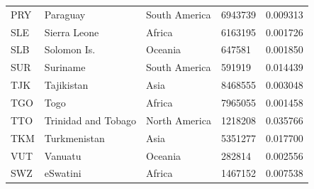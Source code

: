 \documentclass[11pt]{report}
\begin{document}
\begin{table}[h!]
\begin{tabular}{lllll}
            PRY                           & Paraguay                  & South America                  & 6943739                       & 0.009313                           \\
            SLE                           & Sierra Leone              & Africa                         & 6163195                       & 0.001726                           \\
            SLB                           & Solomon Is.               & Oceania                        & 647581                        & 0.001850                           \\
            SUR                           & Suriname                  & South America                  & 591919                        & 0.014439                           \\
            TJK                           & Tajikistan                & Asia                           & 8468555                       & 0.003048                           \\
            TGO                           & Togo                      & Africa                         & 7965055                       & 0.001458                           \\
            TTO                           & Trinidad and Tobago       & North America                  & 1218208                       & 0.035766                           \\
            TKM                           & Turkmenistan              & Asia                           & 5351277                       & 0.017700                           \\
            VUT                           & Vanuatu                   & Oceania                        & 282814                        & 0.002556                           \\
            SWZ                           & eSwatini                  & Africa                         & 1467152                       & 0.007538
        \end{tabular}
    \end{table}
\end{document}
